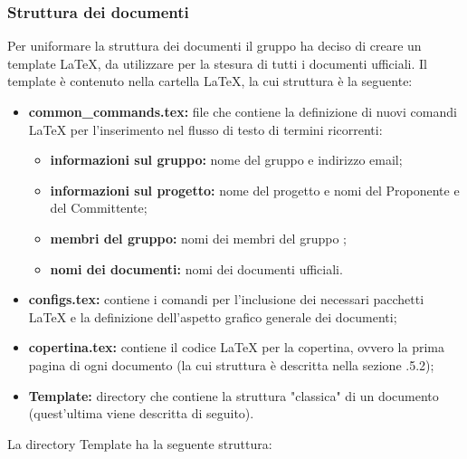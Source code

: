     \subsubsection{Struttura dei documenti}
        Per uniformare la struttura dei documenti il gruppo ha deciso di creare un template \LaTeX{}, da utilizzare per la stesura di tutti i documenti ufficiali. Il template è contenuto nella cartella \LaTeX{}, la cui struttura è la seguente:
        \begin{itemize}
          \item \textbf{common\_commands.tex:} file che contiene la definizione di nuovi comandi \LaTeX{} per l'inserimento nel flusso di testo di termini ricorrenti:
            \begin{itemize}
              \item \textbf{informazioni sul gruppo:} nome del gruppo e indirizzo email;
              \item \textbf{informazioni sul progetto:} nome del progetto e nomi del Proponente e del Committente;
              \item \textbf{membri del gruppo:} nomi dei membri del gruppo \Gruppo;
              \item \textbf{nomi dei documenti:} nomi dei documenti ufficiali.
            \end{itemize}
          \item \textbf{configs.tex:} contiene i comandi per l'inclusione dei necessari pacchetti \LaTeX{} e la definizione dell'aspetto grafico generale dei documenti;
          \item \textbf{copertina.tex:} contiene il codice \LaTeX{} per la copertina, ovvero la prima pagina di ogni documento (la cui struttura è descritta nella sezione .5.2);
          \item \textbf{Template:} directory che contiene la struttura "classica" di un documento (quest'ultima viene descritta di seguito).
        \end{itemize}
        La directory Template ha la seguente struttura:
